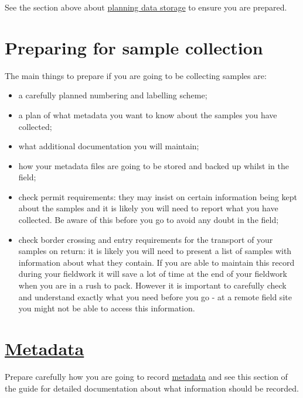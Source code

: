 \documentclass[a4paper,oneside]{report}
\providecommand{\tightlist}{%
  \setlength{\itemsep}{0pt}\setlength{\parskip}{0pt}}
\begin{document}
See the section above about
\protect\hyperlink{how-much-data-are-you-planning-to-collect}{planning
data storage} to ensure you are prepared.

\hypertarget{preparing-for-sample-collection}{%
\section{Preparing for sample
collection}\label{preparing-for-sample-collection}}

The main things to prepare if you are going to be collecting samples
are:

\begin{itemize}
\tightlist
\item
  a carefully planned numbering and labelling scheme;
\item
  a plan of what metadata you want to know about the samples you have
  collected;
\item
  what additional documentation you will maintain;
\item
  how your metadata files are going to be stored and backed up whilst in
  the field;
\item
  check permit requirements: they may insist on certain information
  being kept about the samples and it is likely you will need to report
  what you have collected. Be aware of this before you go to avoid any
  doubt in the field;
\item
  check border crossing and entry requirements for the transport of your
  samples on return: it is likely you will need to present a list of
  samples with information about what they contain. If you are able to
  maintain this record during your fieldwork it will save a lot of time
  at the end of your fieldwork when you are in a rush to pack. However
  it is important to carefully check and understand exactly what you
  need before you go - at a remote field site you might not be able to
  access this information.
\end{itemize}

\hypertarget{metadata}{%
\section{\texorpdfstring{\protect\hyperlink{metadata}{Metadata}}{Metadata}}\label{metadata}}

Prepare carefully how you are going to record
\protect\hyperlink{metadata}{metadata} and see this section of the guide
for detailed documentation about what information should be recorded.
\end{document}
